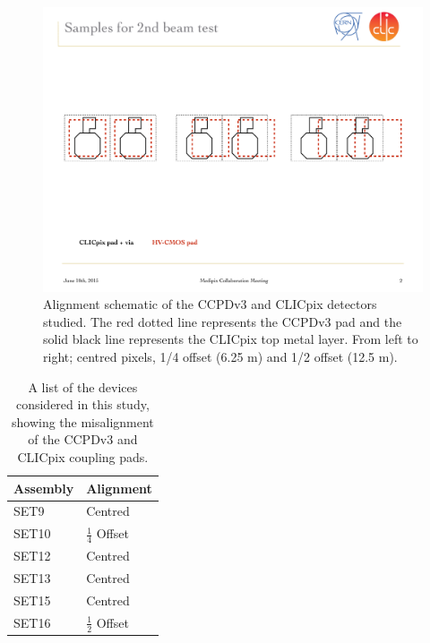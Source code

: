 \begin{figure}[h!]
\centering
\includegraphics[width=1.0\textwidth]{CLICdpVertex/Plots/misalignedPads.pdf}
\caption[Alignment schematic of the CCPDv3 and CLICpix detectors studied.  The red dotted line represents the CCPDv3 pad and the solid black line represents the CLICpix top metal layer.  From left to right; centred pixels, 1/4 offset (6.25 {\mu}m) and 1/2 offset (12.5 {\mu}m).]{Alignment schematic of the CCPDv3 and CLICpix detectors studied.  The red dotted line represents the CCPDv3 pad and the solid black line represents the CLICpix top metal layer.  From left to right; centred pixels, 1/4 offset (6.25 {\mu}m) and 1/2 offset (12.5 {\mu}m).}
\label{fig:alignment}
\end{figure}

\begin{table}[h!]
\centering
\begin{tabular}{ l l }
\hline
Assembly & Alignment \\ 
\hline
SET9 & Centred \\
SET10 & $\frac{1}{4}$ Offset \\
SET12 & Centred \\
SET13 & Centred \\
SET15 & Centred \\
SET16 & $\frac{1}{2}$ Offset \\
\hline
\end{tabular}
\caption[A list of the devices considered in this study, showing the misalignment of the CCPDv3 and CLICpix coupling pads.]{A list of the devices considered in this study, showing the misalignment of the CCPDv3 and CLICpix coupling pads.}
\label{table:alignment}
\end{table}

